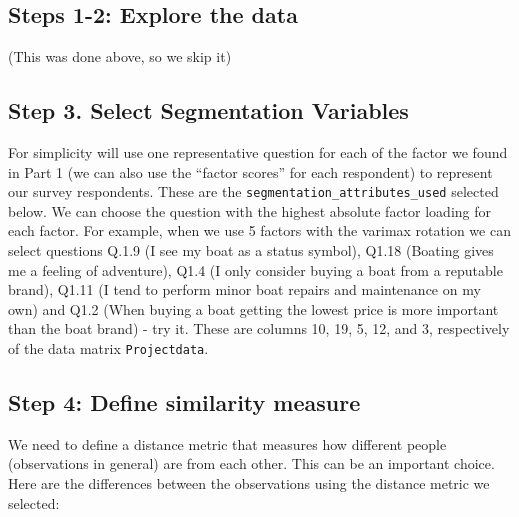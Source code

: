 \documentclass[
]{article}
\begin{document}
\hypertarget{steps-1-2-explore-the-data}{%
\subsection{Steps 1-2: Explore the
data}\label{steps-1-2-explore-the-data}}

(This was done above, so we skip it)

\hypertarget{step-3.-select-segmentation-variables}{%
\subsection{Step 3. Select Segmentation
Variables}\label{step-3.-select-segmentation-variables}}

For simplicity will use one representative question for each of the
factor we found in Part 1 (we can also use the ``factor scores'' for
each respondent) to represent our survey respondents. These are the
\texttt{segmentation\_attributes\_used} selected below. We can choose
the question with the highest absolute factor loading for each factor.
For example, when we use 5 factors with the varimax rotation we can
select questions Q.1.9 (I see my boat as a status symbol), Q1.18
(Boating gives me a feeling of adventure), Q1.4 (I only consider buying
a boat from a reputable brand), Q1.11 (I tend to perform minor boat
repairs and maintenance on my own) and Q1.2 (When buying a boat getting
the lowest price is more important than the boat brand) - try it. These
are columns 10, 19, 5, 12, and 3, respectively of the data matrix
\texttt{Projectdata}.

\hypertarget{step-4-define-similarity-measure}{%
\subsection{Step 4: Define similarity
measure}\label{step-4-define-similarity-measure}}

We need to define a distance metric that measures how different people
(observations in general) are from each other. This can be an important
choice. Here are the differences between the observations using the
distance metric we selected:
\end{document}
